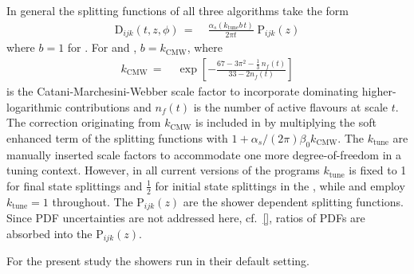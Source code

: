 In general the splitting functions of all three algorithms take the 
form 
\begin{equation}
  \begin{split}\label{eq:psunc:tools:sherpa:sf}
    \mathrm{D}_{ijk}(t,z,\phi)
    \,=\;& \frac{\alpha_s(k_\text{tune}b\,t)}{2\pi t}\;\mathrm{P}_{ijk}(z)
  \end{split}
\end{equation}
where $b=1$ for \Dire. For \CSS and \Ants, $b=k_\text{CMW}$, where
\begin{equation}
  \begin{split}\label{eq:psunc:tools:sherpa:kcmw}
    k_\text{CMW}
    \,=\;&\exp\left[-\frac{67-3\pi^2-\tfrac{1}{3}\,n_f(t)}{33-2n_f(t)}\right]
  \end{split}
\end{equation}
is the Catani-Marchesini-Webber scale factor \cite{Catani:1990rr}
to incorporate dominating higher-logarithmic contributions and $n_f(t)$ 
is the number of active flavours at scale $t$. The correction originating from
$k_\text{CMW}$ is included in \Dire by multiplying the soft enhanced term of the
splitting functions with $1+\alpha_s/(2\pi)\beta_0k_\text{CMW}$. The $k_\text{tune}$ 
are manually inserted scale factors to accommodate one more degree-of-freedom 
in a tuning context. However, in all current versions of the programs 
$k_\text{tune}$ is fixed to 1 for final state splittings and $\tfrac{1}{2}$ 
for initial state splittings in the \CSS, while \Ants and \Dire employ 
$k_\text{tune}=1$ throughout. The $\mathrm{P}_{ijk}(z)$ are the shower 
dependent splitting functions. 
Since PDF uncertainties are not addressed here, cf.\ \ref{}, ratios of 
PDFs are absorbed into the $\mathrm{P}_{ijk}(z)$.

For the present study the showers run in their default setting.


